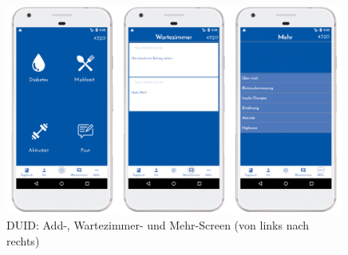 \begin{figure}[H]
	\centering
	\includegraphics[width=0.99\textwidth]{images/drei_digital.png}
	\captionsetup{justification=centering}
	\caption{DUID: Add-, Wartezimmer- und Mehr-Screen (von links nach rechts)}
	\label{img:DUIdreiscreen}
\end{figure}



